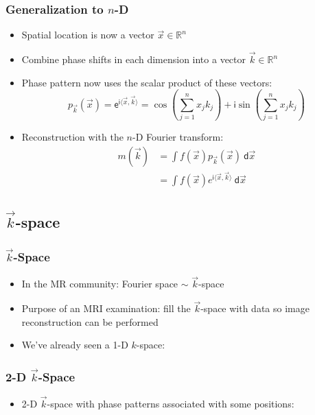 \begin{frame}
	\frametitle{Generalization to $n$-D}
	
	\begin{itemize}
		\item Spatial location is now a vector $\vec x \in \mathbb R^n$
		\item Combine phase shifts in each dimension into a vector $\vec k \in \mathbb R^n$
		\item Phase pattern now uses the scalar product of these vectors:
		$$p_{\vec k}(\vec x) = \mathsf e^{\mathsf i \langle \vec x, \vec k \rangle} = \cos\left( \sum_{j=1}^n x_j k_j \right) + \mathsf i \sin \left( \sum_{j=1}^n x_j k_j \right)$$
		\item Reconstruction with the $n$-D Fourier transform:
		\begin{align*}
			m(\vec k) &= \int f(\vec x) p_{\vec k}(\vec x)\ \mathsf d\vec x \\
			          &= \int f(\vec x) e^{\mathsf i \langle \vec x, \vec k \rangle}\ \mathsf d\vec x
		\end{align*}
	\end{itemize}
\end{frame}




\subsection{$\vec k$-space} %
\label{sub:k_space}

\begin{frame}
	\frametitle{$\vec k$-Space}
	
	\begin{itemize}
		\item In the MR community: Fourier space $\sim$ $\vec k$-space
		\item Purpose of an MRI examination: fill the $\vec k$-space with data so image reconstruction can be performed
		\item We've already seen a 1-D $k$-space:
	\end{itemize}
	
	\begin{center}
		
	\end{center}
	
\end{frame}

\begin{frame}
	\frametitle{2-D $\vec k$-Space}
	
	\begin{itemize}
		\item 2-D $\vec k$-space with phase patterns associated with some positions:
	\end{itemize}
	
	\vspace{-2ex}
	
	\begin{center}
		
	\end{center}
\end{frame}

